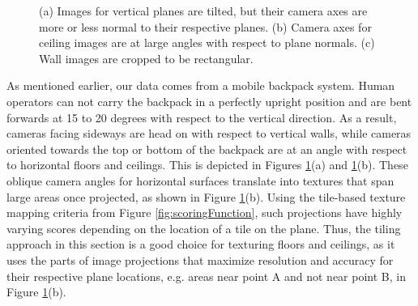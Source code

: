 \documentclass[]{spie}  %
\begin{document}
\begin{figure}
  \centering
  \centering
  \centering
  \caption{(a) Images for vertical planes are tilted, but their camera
    axes are more or less normal to their respective planes. (b)
    Camera axes for ceiling images are at large angles with respect to
    plane normals. (c) Wall images are cropped to be rectangular.}
  \label{fig:projectionAngles}
\end{figure}


As mentioned earlier, our data comes from a mobile backpack
system. Human operators can not carry the backpack in a perfectly
upright position and are bent forwards at 15 to 20 degrees with
respect to the vertical direction. As a result, cameras facing
sideways are head on with respect to vertical walls, while cameras
oriented towards the top or bottom of the backpack are at an angle
with respect to horizontal floors and ceilings. This is depicted in
Figures \ref{fig:projectionAngles}(a) and
\ref{fig:projectionAngles}(b). These oblique camera angles for
horizontal surfaces translate into textures that span large areas once
projected, as shown in Figure \ref{fig:projectionAngles}(b). Using the
tile-based texture mapping criteria from Figure
\ref{fig:scoringFunction}, such projections have highly varying scores
depending on the location of a tile on the plane. Thus, the tiling
approach in this section is a good choice for texturing floors and
ceilings, as it uses the parts of image projections that maximize
resolution and accuracy for their respective plane locations,
e.g. areas near point A and not near point B, in Figure
\ref{fig:projectionAngles}(b).
\end{document}
